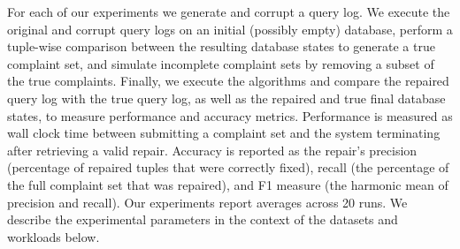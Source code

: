 For each of our experiments we generate and corrupt a query log. 
We execute the original and corrupt query logs on an initial (possibly empty) database,
perform a tuple-wise comparison between the resulting database states to generate a true complaint set,
and simulate incomplete complaint sets by removing a subset of the true complaints.
Finally, we execute the algorithms and compare the repaired query log with the true query log, as well as the repaired and true
final database states, to measure performance and accuracy metrics.
Performance is measured as wall clock
time between submitting a complaint set and the system terminating after retrieving a valid repair.  
Accuracy is reported as the repair's precision (percentage of repaired tuples that were correctly fixed), 
recall (the percentage of the full complaint set that was repaired), 
and F1 measure (the harmonic mean of precision and recall). 
Our experiments report averages across 20 runs.
We describe the experimental parameters in the context of the datasets and workloads below. 




